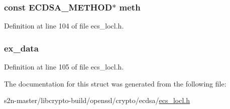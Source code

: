 \subsubsection[{\texorpdfstring{meth}{meth}}]{\setlength{\rightskip}{0pt plus 5cm}const {\bf E\+C\+D\+S\+A\+\_\+\+M\+E\+T\+H\+OD}$\ast$ meth}\hypertarget{structecdsa__data__st_adc7145943aac04edd39dc56750230a7e}{}\label{structecdsa__data__st_adc7145943aac04edd39dc56750230a7e}


Definition at line 104 of file ecs\+\_\+locl.\+h.

\subsubsection[{\texorpdfstring{ex\+\_\+data}{ex_data}}]{ ex\+\_\+data}\hypertarget{structecdsa__data__st_ac3e4fd59d6ee44a81f3a58114613c1e2}{}\label{structecdsa__data__st_ac3e4fd59d6ee44a81f3a58114613c1e2}


Definition at line 105 of file ecs\+\_\+locl.\+h.



The documentation for this struct was generated from the following file\+:\begin{DoxyCompactItemize}
\item 
s2n-\/master/libcrypto-\/build/openssl/crypto/ecdsa/\hyperlink{ecs__locl_8h}{ecs\+\_\+locl.\+h}\end{DoxyCompactItemize}
